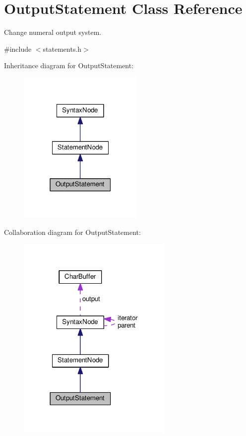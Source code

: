 \hypertarget{classOutputStatement}{}\section{Output\+Statement Class Reference}
\label{classOutputStatement}


Change numeral output system.  




{\ttfamily \#include $<$statements.\+h$>$}



Inheritance diagram for Output\+Statement\+:
\nopagebreak
\begin{figure}[H]
\begin{center}
\leavevmode
\includegraphics[width=171pt]{d4/d1a/classOutputStatement__inherit__graph}
\end{center}
\end{figure}


Collaboration diagram for Output\+Statement\+:
\nopagebreak
\begin{figure}[H]
\begin{center}
\leavevmode
\includegraphics[width=213pt]{dc/d40/classOutputStatement__coll__graph}
\end{center}
\end{figure}
